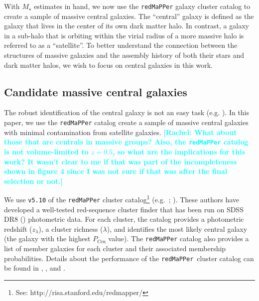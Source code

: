 \documentclass[a4paper,fleqn,usenatbib]{mnras}
\def\redm{\texttt{redMaPPer}}
\def\mstar{{$M_{\star}$}}
\def\logmtot{{$\log (M_{\star,100\mathrm{kpc}}/M_{\odot})$}}
\newcommand{\rachel}[1]{\textcolor{cyan}{\textbf{[Rachel: #1]}}}
\begin{document}
	With  \mstar{} estimates in hand, we now use the \redm{} galaxy cluster catalog to  create a sample of massive central galaxies. The ``central'' galaxy is defined as the galaxy that lives in the 
	center of its own dark matter halo.  
	In contrast, a galaxy in a sub-halo that is orbiting within the virial radius of a 
	more massive halo is referred to as a ``satellite''. 
	To better understand the connection between the structures of massive 
	galaxies and the assembly history of both their stars and dark matter halos, we wish to focus on central 
	galaxies in this work. 
    
\subsection{Candidate massive central galaxies}
    \label{ssec:redmapper}
    
    The robust identification of the central galaxy is not an easy task (e.g. \citealt{Yang2007}). In this paper, we use the \redm{} catalog create a sample of massive central galaxies with minimal contamination from satellite galaxies.
\rachel{What about those that are centrals in massive groups?  Also, the \redm{} catalog is not volume-limited to $z=0.5$, so what are the implications for this work?  It wasn't clear to me if that was part of the incompleteness shown in figure 4 since I was not sure if that was after the final selection or not.}

    
    We use \texttt{v5.10} of the \redm{} cluster  catalog\footnote{See: http://risa.stanford.edu/redmapper/} 
    (e.g.\ \citealt{Rykoff2014}; \citealt{Rozo2015b}). 
    These authors have developed a well-tested red-sequence cluster finder that has 
    been run on SDSS DR8 (\citealt{SDSSDR8}) photometric data. 
    For each cluster, the catalog provides a photometric redshift ($z_{\lambda}$), a 
    cluster richness ($\lambda$), and identifies the most likely central galaxy (the 
    galaxy with the highest $P_{\mathrm{Cen}}$ value). 
    The \redm{}{} catalog also provides a list of member galaxies for each cluster and 
    their associated membership probabilities. 
    Details about the performance of the \redm{}~cluster catalog can be found in 
    \citet{Rozo2014}, \citet{Rozo2015a}, and \citet{Rozo2015b}. 
    
\end{document}
